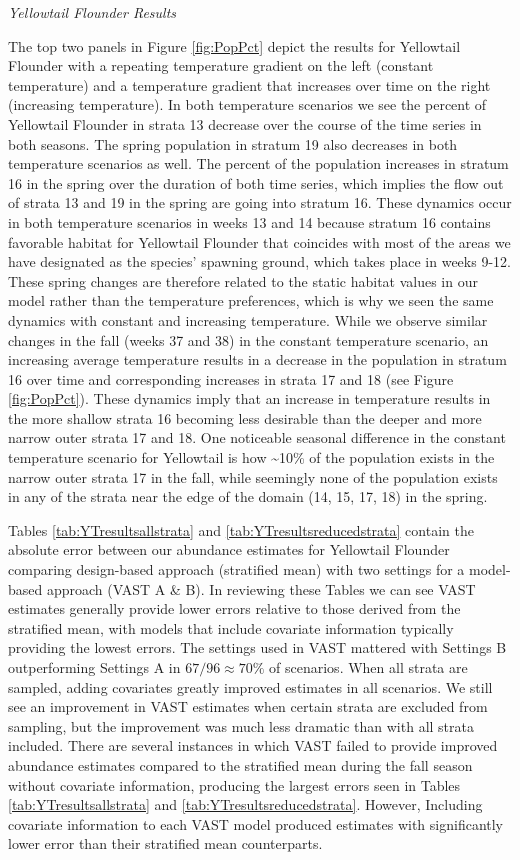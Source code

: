 \documentclass[
  12pt,
]{article}
\begin{document}
\emph{Yellowtail Flounder Results}

The top two panels in Figure \ref{fig:PopPct} depict the results for Yellowtail Flounder with a repeating temperature gradient on the left (constant temperature) and a temperature gradient that increases over time on the right (increasing temperature). In both temperature scenarios we see the percent of Yellowtail Flounder in strata 13 decrease over the course of the time series in both seasons. The spring population in stratum 19 also decreases in both temperature scenarios as well. The percent of the population increases in stratum 16 in the spring over the duration of both time series, which implies the flow out of strata 13 and 19 in the spring are going into stratum 16. These dynamics occur in both temperature scenarios in weeks 13 and 14 because stratum 16 contains favorable habitat for Yellowtail Flounder that coincides with most of the areas we have designated as the species' spawning ground, which takes place in weeks 9-12. These spring changes are therefore related to the static habitat values in our model rather than the temperature preferences, which is why we seen the same dynamics with constant and increasing temperature. While we observe similar changes in the fall (weeks 37 and 38) in the constant temperature scenario, an increasing average temperature results in a decrease in the population in stratum 16 over time and corresponding increases in strata 17 and 18 (see Figure \ref{fig:PopPct}). These dynamics imply that an increase in temperature results in the more shallow strata 16 becoming less desirable than the deeper and more narrow outer strata 17 and 18. One noticeable seasonal difference in the constant temperature scenario for Yellowtail is how \textasciitilde10\% of the population exists in the narrow outer strata 17 in the fall, while seemingly none of the population exists in any of the strata near the edge of the domain (14, 15, 17, 18) in the spring.

Tables \ref{tab:YTresultsallstrata} and \ref{tab:YTresultsreducedstrata} contain the absolute error between our abundance estimates for Yellowtail Flounder comparing design-based approach (stratified mean) with two settings for a model-based approach (VAST A \& B). In reviewing these Tables we can see VAST estimates generally provide lower errors relative to those derived from the stratified mean, with models that include covariate information typically providing the lowest errors. The settings used in VAST mattered with Settings B outperforming Settings A in \(67/96\approx 70\%\) of scenarios. When all strata are sampled, adding covariates greatly improved estimates in all scenarios. We still see an improvement in VAST estimates when certain strata are excluded from sampling, but the improvement was much less dramatic than with all strata included. There are several instances in which VAST failed to provide improved abundance estimates compared to the stratified mean during the fall season without covariate information, producing the largest errors seen in Tables \ref{tab:YTresultsallstrata} and \ref{tab:YTresultsreducedstrata}. However, Including covariate information to each VAST model produced estimates with significantly lower error than their stratified mean counterparts.
\end{document}
